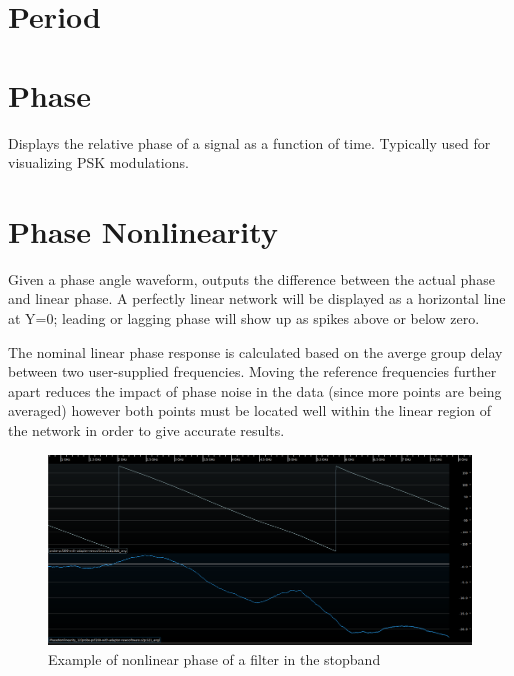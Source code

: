 \pagebreak
\section{Period}

\pagebreak
\section{Phase}

Displays the relative phase of a signal as a function of time. Typically used for visualizing PSK modulations.

\pagebreak
\section{Phase Nonlinearity}

Given a phase angle waveform, outputs the difference between the actual phase and linear phase. A perfectly linear
network will be displayed as a horizontal line at Y=0; leading or lagging phase will show up as spikes above or below
zero.

The nominal linear phase response is calculated based on the averge group delay between two user-supplied frequencies.
Moving the reference frequencies further apart reduces the impact of phase noise in the data (since more points are
being averaged) however both points must be located well within the linear region of the network in order to give
accurate results.

\begin{figure}[h]
\centering
\includegraphics[width=16cm]{images/filters/phase-nonlinearity.png}
\caption{Example of nonlinear phase of a filter in the stopband}
\label{phase_nonlinearity_example}
\end{figure}

